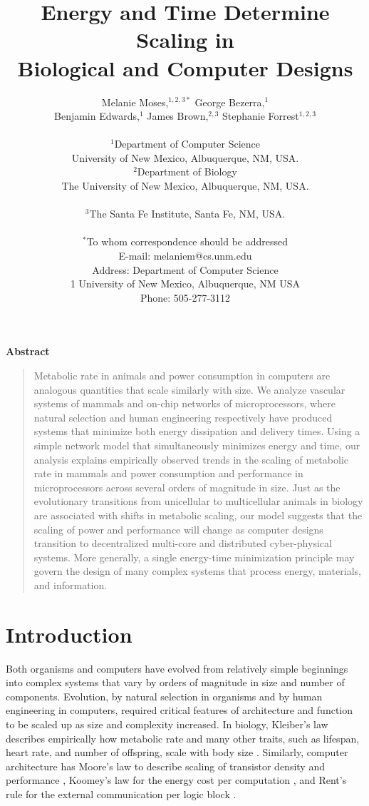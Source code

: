\documentclass[12pt]{article}
\title{Energy and Time Determine Scaling in \\Biological and Computer Designs}
\author
{Melanie Moses,$^{1,2,3\ast}$ George Bezerra,$^{1}$ \\Benjamin Edwards,$^{1}$ James Brown,$^{2,3}$ Stephanie Forrest$^{1,2,3}$\\
\\
\normalsize{$^{1}$Department of Computer Science}\\
\normalsize{University of New Mexico, Albuquerque, NM, USA.}\\
\normalsize{$^{2}$Department of Biology}\\
\normalsize{The University of New Mexico, Albuquerque, NM, USA.}\\
\\
\normalsize{$^{3}$The Santa Fe Institute, Santa Fe, NM, USA.}\\
\\
\normalsize{$^\ast$To whom correspondence should be addressed}\\
\normalsize{E-mail: melaniem@cs.unm.edu}\\
\normalsize{Address: Department of Computer Science}\\
\normalsize{1 University of New Mexico, Albuquerque, NM USA}\\
\normalsize{Phone: 505-277-3112}\\
}
\newenvironment{sciabstract}{%
\begin{quote} \bf}
{\end{quote}}
\begin{document}
 

\newenvironment{caseof}{\setcounter{casenum}{1}}{\vskip.5\baselineskip}
\newcommand{\case}[2]{\vskip.5\baselineskip\par\noindent {\bfseries Case
\arabic{casenum}:} #1: #2\addtocounter{casenum}{1}}


\baselineskip24pt


\maketitle 


\newpage


\centerline{\Large{\bf Abstract}}

\begin{sciabstract}

  Metabolic rate in animals and power consumption in computers are analogous
  quantities that scale similarly with size.  We analyze vascular systems of
  mammals and on-chip networks of microprocessors, where natural selection
  and human engineering respectively have produced systems that minimize both energy dissipation
  and delivery times.   
  Using a simple network model that simultaneously minimizes energy
  and time, our analysis explains empirically observed trends in the scaling of metabolic rate in mammals  and power consumption and performance in microprocessors across several orders of magnitude
  in size.  Just as
  the evolutionary transitions from unicellular to multicellular animals in biology are associated with shifts in
  metabolic scaling, our model suggests that the scaling of power and performance will change
  as computer designs transition to decentralized multi-core and
  distributed cyber-physical systems. More generally, a single energy-time minimization principle may govern the design of many complex systems that process energy, materials, and information. 

\end{sciabstract}

\newpage

\section{Introduction}
\label{sec:intro}

Both organisms and computers have evolved from relatively simple beginnings
into complex systems that vary by orders of magnitude in size and number of
components. Evolution, by natural selection in organisms and by human
engineering in computers, required critical features of architecture and
function to be scaled up as size and complexity increased. In biology,
Kleiber's law describes empirically how metabolic rate and many
other traits, such as lifespan, heart rate, and number of offspring, scale with body
size \cite{kleiber47}.  Similarly, computer architecture has Moore's law to
describe scaling of transistor density and performance \cite{moore98}, Koomey's
law for the energy cost per computation \cite{koomey11}, and Rent's rule for
the external communication per logic block \cite{christie00}.
\end{document}
